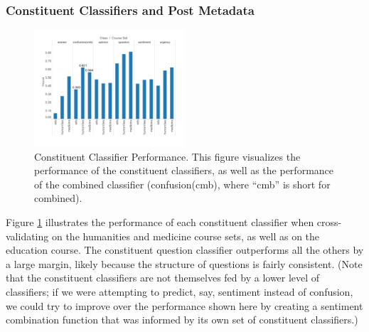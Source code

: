 \documentclass{edm_template}
\begin{document}
\subsubsection{Constituent Classifiers and Post Metadata}

\begin{figure}
\vspace{-18pt}
       \centering
       \includegraphics[width=0.5\textwidth]{../Figs/classifierEvalsWithEduAltLayout.pdf}
       \vspace{-30pt}
       \caption{\textnormal{Constituent Classifier Performance. This figure visualizes the performance of the constituent classifiers, as well as the performance of the combined classifier (confusion(cmb), where ``cmb'' is short for combined).}}
      \label{figure:constituents}
\end{figure}

Figure \ref{figure:constituents} illustrates the performance of each constituent classifier when cross-validating on the humanities and medicine course sets, as well as on the education course. The constituent question classifier outperforms all the others by a large margin, likely because the structure of questions is fairly consistent. (Note that the constituent classifiers are not themselves fed by a lower level of classifiers; if we were attempting to predict, say, sentiment instead of confusion, we could try to improve over the performance shown here by creating a sentiment combination function that was informed by its own set of constituent classifiers.)
\end{document}

